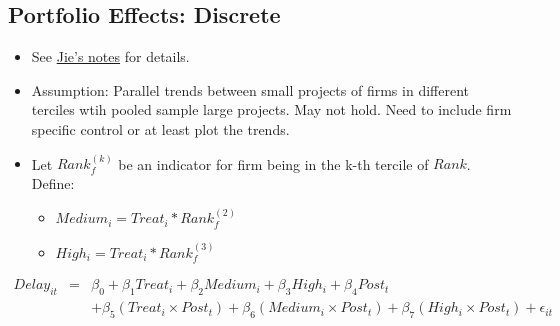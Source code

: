 \documentclass[]{article}
\providecommand{\tightlist}{%
  \setlength{\itemsep}{0pt}\setlength{\parskip}{0pt}}
\begin{document}
\hypertarget{portfolio-effects-discrete}{%
\subsection{Portfolio Effects:
Discrete}\label{portfolio-effects-discrete}}

\begin{itemize}
\tightlist
\item
  See
  \href{https://github.com/QuickPay-Operational-Performance/Data-and-code/blob/master/notes/Portfolio\%20model\%2B0308.pdf}{Jie's
  notes} for details.
\item
  Assumption: Parallel trends between small projects of firms in
  different terciles wtih pooled sample large projects. May not hold.
  Need to include firm specific control or at least plot the trends.
\item
  Let \(Rank_f^{(k)}\) be an indicator for firm being in the k-th
  tercile of \(Rank\). Define:

  \begin{itemize}
  \tightlist
  \item
    \(Medium_i = Treat_i * Rank_f^{(2)}\)
  \item
    \(High_i = Treat_i * Rank_f^{(3)}\)
  \end{itemize}
\end{itemize}

\[\begin{aligned} Delay_{it} &=& \beta_0+\beta_1 Treat_i + \beta_2 Medium_i+\beta_3 High_i +\beta_4 Post_t\\ && +\beta_5( Treat_i\times Post_t) + \beta_6(Medium_i\times Post_t) + \beta_7(High_i\times Post_t) + \epsilon_{it} \end{aligned}\]
\end{document}
